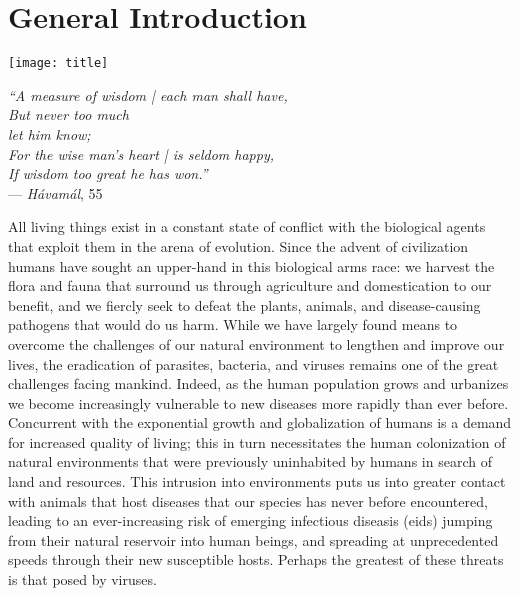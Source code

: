 \chapter{General Introduction}\label{ch:introduction}

\begin{minipage}[b]{0.6\textwidth}
  \texttt{[image: title]} %
\end{minipage}
\hfill
\begin{minipage}[b]{0.35\textwidth}
  \begin{flushright}
    \footnotesize
    \textit{``A measure of wisdom | each man shall have,\\
    But never too much\\let him know;\\
    For the wise man's heart | is seldom happy,\\
    If wisdom too great he has won.''} \\
    --- \textit{H\'avam\'al}, 55 
  \end{flushright}
  \vspace{2cm}
\end{minipage}

\clearpage


All living things exist in a constant state of conflict with the biological agents that exploit them in the arena of evolution.
Since the advent of civilization humans have sought an upper-hand in this biological arms race: we harvest the flora and fauna that surround us through agriculture and domestication to our benefit, and we fiercly seek to defeat the plants, animals, and disease-causing pathogens that would do us harm.
While we have largely found means to overcome the challenges of our natural environment to lengthen and improve our lives, the eradication of parasites, bacteria, and viruses remains one of the great challenges facing mankind.
Indeed, as the human population grows and urbanizes we become increasingly vulnerable to new diseases more rapidly than ever before.
Concurrent with the exponential growth and globalization of humans is a demand for increased quality of living; this in turn necessitates the human colonization of natural environments that were previously uninhabited by humans in search of land and resources.
This intrusion into environments puts us into greater contact with animals that host diseases that our species has never before encountered, leading to an ever-increasing risk of emerging infectious diseasis (\gls{eid}s) jumping from their natural reservoir into human beings, and spreading at unprecedented speeds through their new susceptible hosts.
Perhaps the greatest of these threats is that posed by viruses.

